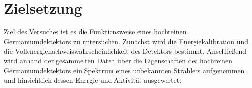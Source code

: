 \section{Zielsetzung}
\label{sec:zielsetzung}

Ziel des Versuches ist es die Funktionsweise eines hochreinen Germaniumdektektors zu untersuchen.
Zunächst wird die Energiekalibration und die Vollenergienachweiswahrscheinlichkeit des Detektors
bestimmt.
Anschließend wird anhand der gesammelten Daten über die Eigenschaften des hochreinen Germaniumdektektors
ein Spektrum eines unbekannten Strahlers aufgenommen und hinsichtlich dessen Energie und Aktivität ausgewertet.
